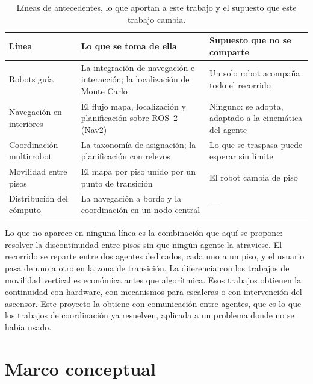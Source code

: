 \begin{table}[H]
  \centering\small
  \caption{Líneas de antecedentes, lo que aportan a este trabajo y el supuesto
    que este trabajo cambia.}
  \label{tab:antecedentes}
  \begin{tabular}{@{}p{}p{}p{}@{}}
    \toprule
    \textbf{Línea} & \textbf{Lo que se toma de ella} & \textbf{Supuesto que no se comparte} \\ \midrule
    Robots guía & La integración de navegación e interacción; la localización de Monte Carlo & Un solo robot acompaña todo el recorrido \\ \addlinespace
    Navegación en interiores & El flujo mapa, localización y planificación sobre ROS~2 (Nav2) & Ninguno: se adopta, adaptado a la cinemática del agente \\ \addlinespace
    Coordinación multirrobot & La taxonomía de asignación; la planificación con relevos & Lo que se traspasa puede esperar sin límite \\ \addlinespace
    Movilidad entre pisos & El mapa por piso unido por un punto de transición & El robot cambia de piso \\ \addlinespace
    Distribución del cómputo & La navegación a bordo y la coordinación en un nodo central & --- \\ \bottomrule
  \end{tabular}
\end{table}

Lo que no aparece en ninguna línea es la combinación que aquí se propone:
resolver la discontinuidad entre pisos sin que ningún agente la atraviese. El
recorrido se reparte entre dos agentes dedicados, cada uno a un piso, y el
usuario pasa de uno a otro en la zona de transición. La diferencia con los
trabajos de movilidad vertical es económica antes que algorítmica. Esos trabajos
obtienen la continuidad con hardware, con mecanismos para escaleras o con
intervención del ascensor. Este proyecto la obtiene con comunicación entre
agentes, que es lo que los trabajos de coordinación ya resuelven, aplicada a un
problema donde no se había usado.

\section{Marco conceptual}
\label{sec:conceptual}

